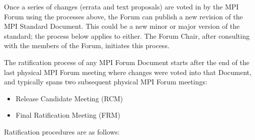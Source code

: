 Once a series of changes (errata and text proposals) are voted in by
the MPI Forum using the processes above, the Forum can publish a new
revision of the MPI Standard Document.  This could be a new minor or
major version of the standard; the process below applies to either.
The Forum Chair, after consulting with the members of the Forum,
initiates this process.

The ratification process of any MPI Forum Document starts after the
end of the last physical MPI Forum meeting where changes were voted
into that Document, and typically spans two subsequent physical MPI
Forum meetings:

\begin{itemize}
\item Release Candidate Meeting (RCM)
\item Final Ratification Meeting (FRM)
\end{itemize}

Ratification procedures are as follows:

